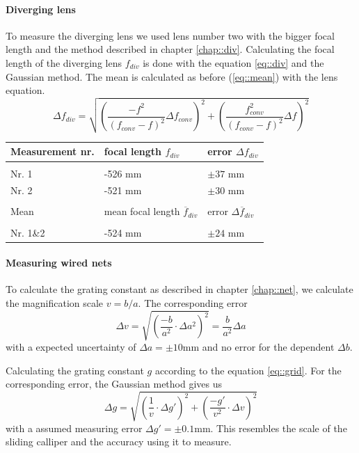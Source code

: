 \paragraph{Diverging lens}
To measure the diverging lens we used lens number two with the bigger focal length and the method described in chapter \ref{chap::div}.
Calculating the focal length of the diverging lens $f_{div}$ is done with the equation \ref{eq::div} and the Gaussian method. The mean is calculated as before (\ref{eq::mean}) with the lens equation.
\[
\Delta f_{div}= \sqrt{\left(\frac{-f^2}{(f_{conv}-f)^2} \Delta f_{conv}\right)^2+  \left(\frac{f_{conv}^2}{(f_{conv}-f)^2} \Delta f \right)^2}
\] 


\begin{tabularx}{\textwidth}{XM{5cm}M{5cm}}%
	\toprule 
	Measurement nr.&focal length $f_{div}$ & error $\Delta f_{div}$\\
	\hline
	&&\\[-5pt]
	Nr. 1	& -526 \si{\milli \m} & $\pm 37$ \si{\milli \m}	\\
	Nr. 2	& -521 \si{\milli \m} & $\pm 30$ \si{\milli \m}	\\
	\toprule
	&&\\[-5pt]
	Mean	& mean focal length $\overline{f}_{div}$ & error $\Delta \overline{f}_{div}$\\[5pt]
	\midrule
	&&\\[-5pt]
	Nr. 1\&2	& -524 \si{\milli \m} & $\pm 24$ \si{\milli \m}	\\
	\bottomrule 
\end{tabularx}

\paragraph{Measuring wired nets}
To calculate the grating constant as described in chapter \ref{chap::net}, we calculate the magnification scale $v= b/a$.
The corresponding error 
\[
\Delta v= \sqrt{\left(\frac{-b}{a^2} \cdot \Delta a^2\right)^2} = \frac{b}{a^2} \Delta a
\] 
with a expected uncertainty of $\Delta a =\pm 10$\si{\milli \m} and no error for the dependent $\Delta b$.

Calculating the grating constant $g$ according to the equation \ref{eq::grid}.
For the corresponding error, the Gaussian method gives us 
\[
\Delta g= \sqrt{\left(\frac{1}{v} \cdot \Delta g'\right)^2 + \left(\frac{-g'}{v^2} \cdot \Delta v\right)^2}  
\]
with a assumed measuring error $\Delta g' = \pm 0.1$\si{\milli \m}.
This resembles the scale of the sliding calliper and the accuracy using it to measure.

